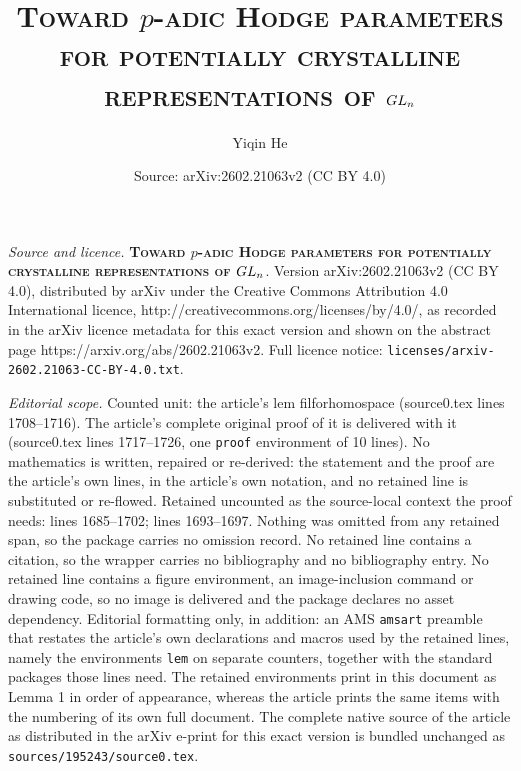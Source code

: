 \documentclass[10pt,a4paper]{amsart}
\title{\textbf{\textsc{Toward $p$-adic Hodge parameters for potentially crystalline representations of $\GLN_n$}}}
\author{Yiqin He}
\date{Source: arXiv:2602.21063v2 (CC BY 4.0)}
\newcommand{\GLN}{{\rm GL}}
\begin{document}
\maketitle

\noindent\emph{Source and licence.} \textbf{\textsc{Toward $p$-adic Hodge parameters for potentially crystalline representations of $\GLN_n$}}. Version arXiv:2602.21063v2 (CC BY 4.0), distributed by arXiv under the Creative Commons Attribution 4.0 International licence, http://creativecommons.org/licenses/by/4.0/, as recorded in the arXiv licence metadata for this exact version and shown on the abstract page https://arxiv.org/abs/2602.21063v2. Full licence notice: \texttt{licenses/arxiv-2602.21063-CC-BY-4.0.txt}.\par\smallskip

\noindent\textit{Editorial scope.} Counted unit: the article's lem filforhomospace (source0.tex lines 1708--1716). The article's complete original proof of it is delivered with it (source0.tex lines 1717--1726, one \texttt{proof} environment of 10 lines). No mathematics is written, repaired or re-derived: the statement and the proof are the article's own lines, in the article's own notation, and no retained line is substituted or re-flowed.  Retained uncounted as the source-local context the proof needs: lines 1685--1702; lines 1693--1697.  Nothing was omitted from any retained span, so the package carries no omission record.  No retained line contains a citation, so the wrapper carries no bibliography and no bibliography entry.  No retained line contains a figure environment, an image-inclusion command or drawing code, so no image is delivered and the package declares no asset dependency.  Editorial formatting only, in addition: an AMS \texttt{amsart} preamble that restates the article's own declarations and macros used by the retained lines, namely the environments \texttt{lem} on separate counters, together with the standard packages those lines need.  The retained environments print in this document as Lemma 1 in order of appearance, whereas the article prints the same items with the numbering of its own full document.  The complete native source of the article as distributed in the arXiv e-print for this exact version is bundled unchanged as \texttt{sources/195243/source0.tex}.
\end{document}
